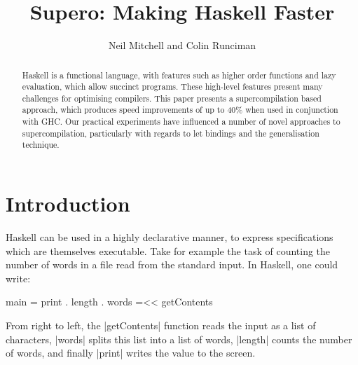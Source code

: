 \documentclass{llncs}
\begin{document}
%

\title{Supero: Making Haskell Faster}

\author{Neil Mitchell and Colin Runciman}


\maketitle              %

\begin{abstract}
Haskell is a functional language, with features such as higher order functions and lazy evaluation, which allow succinct programs. These high-level features present many challenges for optimising compilers. This paper presents a supercompilation based approach, which produces speed improvements of up to 40\% when used in conjunction with GHC. Our practical experiments have influenced a number of novel approaches to supercompilation, particularly with regards to let bindings and the generalisation technique.
\end{abstract}

\section{Introduction}

Haskell \cite{haskell} can be used in a highly declarative manner, to express specifications which are themselves executable. Take for example the task of counting the number of words in a file read from the standard input. In Haskell, one could write:

\begin{code}
main = print . length . words =<< getContents
\end{code}

From right to left, the |getContents| function reads the input as a list of characters, |words| splits this list into a list of words, |length| counts the number of words, and finally |print| writes the value to the screen.
\end{document}
